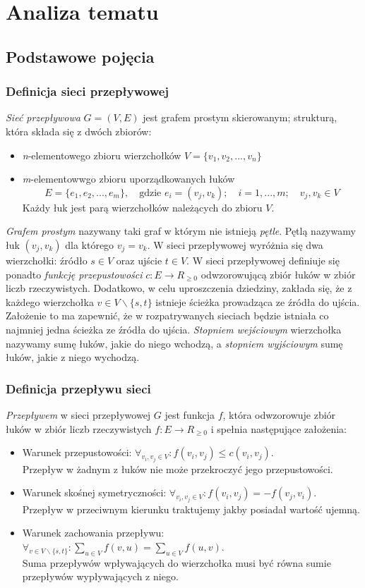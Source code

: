 \chapter{Analiza tematu}
\section{Podstawowe pojęcia}
\subsection{Definicja sieci przepływowej}\label{ssec:graphDef}
\emph{Sieć przepływowa} $ G=(V, E) $ jest grafem prostym skierowanym; strukturą, która składa się z dwóch zbiorów:
\begin{itemize}
	\item \textit{n}-elementowego zbioru wierzchołków $ V = \{v_1,v_2,...,v_n \}$
	\item \textit{m}-elementowwgo zbioru uporządkowanych łuków
	$$ E = \{e_1,e_2,...,e_m \},\quad \text{gdzie } e_i=(v_j,v_k);\quad i=1,...,m;\quad v_j,v_k\in V$$
	Każdy łuk jest parą wierzchołków należących do zbioru $ V $.
\end{itemize}
\emph{Grafem prostym} nazywany taki graf w którym nie istnieją \emph{pętle}. Pętlą nazywamy łuk $ (v_j,v_k) $ dla którego $ v_j=v_k $. W sieci przepływowej wyróżnia się dwa wierzchołki: źródło $ s \in V $ oraz ujście $ t \in V $. W sieci przepływowej definiuje się ponadto \emph{funkcję przepustowości} $ c : E\rightarrow R_{\ge0}$ odwzorowującą zbiór łuków w zbiór liczb rzeczywistych. Dodatkowo, w celu uproszczenia dziedziny, zakłada się, że z każdego wierzchołka $ v\in V\backslash\{s, t\} $ istnieje ścieżka prowadząca ze źródła do ujścia. Założenie to ma zapewnić, że w rozpatrywanych sieciach będzie istniała co najmniej jedna ścieżka ze źródła do ujścia.
\emph{Stopniem wejściowym} wierzchołka nazywamy sumę łuków, jakie do niego wchodzą, a \emph{stopniem wyjściowym} sumę łuków, jakie z niego wychodzą.
\subsection{Definicja przepływu sieci}\label{ssec:flowDef}
\emph{Przepływem} w sieci przepływowej $ G $ jest funkcja $ f $, która odwzorowuje zbiór łuków w zbiór liczb rzeczywistych $ f : E \rightarrow R_{\ge0} $ i spełnia następujące założenia:
\begin{itemize}
	\item Warunek przepustowości: $ \forall_{v_i, v_j\in V} : f(v_i, v_j) \le c(v_i, v_j) $.\\Przepływ w żadnym z łuków nie może przekroczyć jego przepustowości.
	\item Warunek skośnej symetryczności: $ \forall_{v_i, v_j\in V} : f(v_i, v_j) = -f(v_j, v_i) $.\\Przepływ w przeciwnym kierunku traktujemy jakby posiadał wartość ujemną.
	\item Warunek zachowania przepływu: $ \forall_{v\in V\backslash\{s, t\}} : \sum_{u\in V}f(v,u)=\sum_{u\in V}f(u,v) $.\\Suma przepływów wpływających do wierzchołka musi być równa sumie przepływów wypływających z niego.
\end{itemize}
